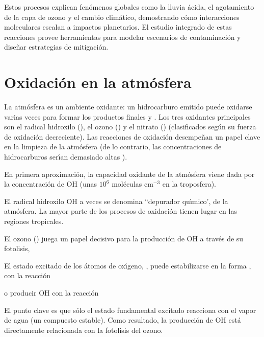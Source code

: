 Estos procesos explican fen\'omenos globales como la lluvia \'acida, el agotamiento de la capa de ozono y el cambio clim\'atico, demostrando c\'omo interacciones moleculares escalan a impactos planetarios. El estudio integrado de estas reacciones provee herramientas para modelar escenarios de contaminaci\'on y dise\~nar estrategias de mitigaci\'on.

\section{Oxidaci\'on en la atm\'osfera}
\label{7quim}

La atm\'osfera es un ambiente oxidante: un hidrocarburo emitido puede oxidarse varias veces para formar los productos finales  y . Los tres oxidantes principales son el radical hidroxilo (), el ozono () y el nitrato () (clasificados seg\'un su fuerza de oxidaci\'on decreciente).  Las reacciones de oxidaci\'on desempe\~nan un papel clave en la limpieza de la atm\'osfera (de lo contrario, las concentraciones de hidrocarburos ser\'{\i}an demasiado altas ).

En primera aproximaci\'on, la capacidad oxidante de la atm\'osfera viene dada por la concentraci\'on de OH (unas $10^6$ mol\'eculas cm${^{-3}}$ en la troposfera).

El radical hidroxilo OH a veces se denomina ``depurador qu\'{\i}mico', de la atm\'osfera. La mayor parte de los procesos de oxidaci\'on tienen lugar en las regiones tropicales.

El ozono ()  juega un papel decisivo para la producci\'on de OH a trav\'es de su fotolisis,


El estado excitado de los \'atomos de ox\'{\i}geno, , puede estabilizarse en la forma , con la reacci\'on


o producir OH con la reacci\'on

El punto clave es que s\'olo el estado fundamental excitado  reacciona con el vapor de agua (un compuesto estable). Como resultado, la producci\'on de OH est\'a directamente relacionada con la fotolisis del ozono.


